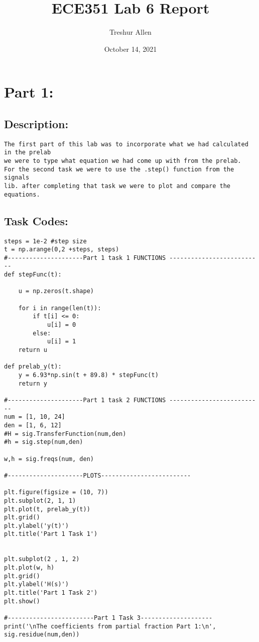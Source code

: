 \documentclass{article}
\title{ECE351 Lab 6 Report}
\author{Treshur Allen }
\date{October 14, 2021}
\begin{document}
\pagebreak

\maketitle

\section{Part 1:}

\subsection{Description:}

\begin{verbatim}
The first part of this lab was to incorporate what we had calculated in the prelab
we were to type what equation we had come up with from the prelab.
For the second task we were to use the .step() function from the signals 
lib. after completing that task we were to plot and compare the equations. 

\end{verbatim}

\subsection{Task Codes:}

\begin{verbatim}
steps = 1e-2 #step size
t = np.arange(0,2 +steps, steps)
#---------------------Part 1 task 1 FUNCTIONS --------------------------
def stepFunc(t):
   
    u = np.zeros(t.shape)
    
    for i in range(len(t)):
        if t[i] <= 0:  
            u[i] = 0
        else:
            u[i] = 1
    return u

def prelab_y(t):
    y = 6.93*np.sin(t + 89.8) * stepFunc(t) 
    return y

#---------------------Part 1 task 2 FUNCTIONS --------------------------
num = [1, 10, 24]
den = [1, 6, 12]
#H = sig.TransferFunction(num,den)
#h = sig.step(num,den)

w,h = sig.freqs(num, den)

#---------------------PLOTS-------------------------

plt.figure(figsize = (10, 7))
plt.subplot(2, 1, 1)
plt.plot(t, prelab_y(t))
plt.grid()
plt.ylabel('y(t)')
plt.title('Part 1 Task 1')


plt.subplot(2 , 1, 2)
plt.plot(w, h)
plt.grid()
plt.ylabel('H(s)')
plt.title('Part 1 Task 2')
plt.show()

#------------------------Part 1 Task 3--------------------
print('\nThe coefficients from partial fraction Part 1:\n', sig.residue(num,den))

\end{verbatim}
\end{document}
